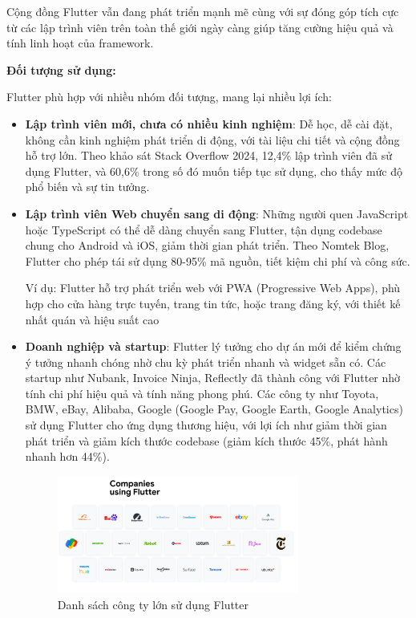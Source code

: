 \documentclass[../DoAn.tex]{subfiles}
\numberwithin{figure}{chapter}
\begin{document}
Cộng đồng Flutter vẫn đang phát triển mạnh mẽ cùng với sự đóng góp tích cực từ các lập trình viên trên toàn thế giới ngày càng giúp tăng cường hiệu quả và tính linh hoạt của framework.

\textbf{Đối tượng sử dụng:}

Flutter phù hợp với nhiều nhóm đối tượng, mang lại nhiều lợi ích:
\begin{itemize}
\item \textbf{Lập trình viên mới, chưa có nhiều kinh nghiệm}: Dễ học, dễ cài đặt, không cần kinh nghiệm phát triển di động, với tài liệu chi tiết và cộng đồng hỗ trợ lớn. Theo khảo sát Stack Overflow 2024, 12,4\% lập trình viên đã sử dụng Flutter, và 60,6\% trong số đó muốn tiếp tục sử dụng, cho thấy mức độ phổ biến và sự tin tưởng.

\item \textbf{Lập trình viên Web chuyển sang di động}: Những người quen JavaScript hoặc TypeScript có thể dễ dàng chuyển sang Flutter, tận dụng codebase chung cho Android và iOS, giảm thời gian phát triển. Theo Nomtek Blog, Flutter cho phép tái sử dụng 80-95\% mã nguồn, tiết kiệm chi phí và công sức.

Ví dụ:  Flutter hỗ trợ phát triển web với PWA (Progressive Web Apps), phù hợp cho cửa hàng trực tuyến, trang tin tức, hoặc trang đăng ký, với thiết kế nhất quán và hiệu suất cao

\item \textbf{Doanh nghiệp và startup}: Flutter lý tưởng cho dự án mới để kiểm chứng ý tưởng nhanh chóng nhờ chu kỳ phát triển nhanh và widget sẵn có. Các startup như Nubank, Invoice Ninja, Reflectly đã thành công với Flutter nhờ tính chi phí hiệu quả và tính năng phong phú. Các công ty như Toyota, BMW, eBay, Alibaba, Google (Google Pay, Google Earth, Google Analytics) sử dụng Flutter cho ứng dụng thương hiệu, với lợi ích như giảm thời gian phát triển và giảm kích thước codebase (giảm kích thước 45\%, phát hành nhanh hơn 44\%).

\begin{figure}[H]
    \centering
    \includegraphics[width=0.75\textwidth]{Hinhve/Chuong5/companyusingflutter.png}
    \caption{Danh sách công ty lớn sử dụng Flutter}
    \label{fig:companyusingflutter}
\end{figure}

\end{itemize}
\end{document}

